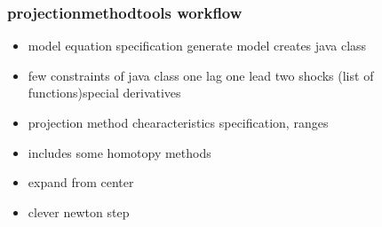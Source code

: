 \documentclass[handout]{beamer}
\begin{document}




















\begin{frame}
  \frametitle{projectionmethodtools workflow}
  \begin{itemize}
  \item model equation specification generate model creates java class
  \item few constraints of java class  one lag one lead two shocks (list of functions)special derivatives
  \item projection method chearacteristics specification, ranges
    \item includes some homotopy methods
    \item expand from center
    \item clever newton step
  \end{itemize}
\end{frame}
\end{document}
